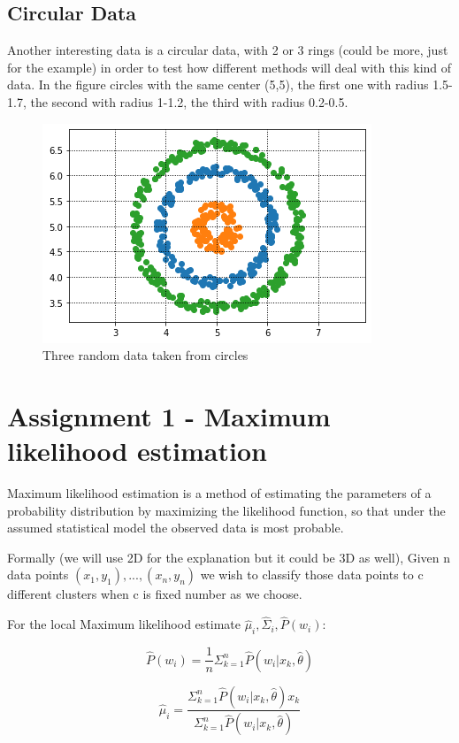 \documentclass[12pt, a4paper]{paper}
\begin{document}
\subsection*{Circular Data}
Another interesting data is a circular data, with 2 or 3 rings (could be more, just for the example) in order to test how different methods will deal with this kind of data. 
In the figure circles with the same center (5,5), the first one with radius 1.5-1.7, the second with radius 1-1.2, the third with radius 0.2-0.5.
\begin{figure}[h!]
\centering
\includegraphics[scale=0.7]{circle.png}
\caption{Three random data taken from circles}
\label{fig:circles}
\end{figure}


\section*{Assignment 1 - Maximum likelihood estimation}

Maximum likelihood estimation is a method of estimating the parameters of a probability distribution by maximizing the likelihood function, so that under the assumed statistical model the observed data is most probable.

Formally (we will use 2D for the explanation but it could be 3D as well), Given n data points $(x_{1}, y_{1}),...,(x_{n},y_{n})$ we wish to classify those data points to c different clusters when c is fixed number as we choose. 

For the local Maximum likelihood estimate $\hat{\mu}_{i}, \hat{\Sigma}_{i}, \hat{P}(w_{i})$:

\begin{equation}
\hat{P}(w_{i}) = \frac{1}{n} \Sigma_{k=1}^n \hat{P}(w_{i}|x_{k}, \hat{\theta})
\end{equation}

\begin{equation}
\hat{\mu}_{i} = \frac
{\Sigma_{k=1}^n \hat{P}(w_{i}|x_{k}, \hat{\theta})x_{k}}
{\Sigma_{k=1}^n \hat{P}(w_{i}|x_{k}, \hat{\theta})} 
\end{equation}
\end{document}
